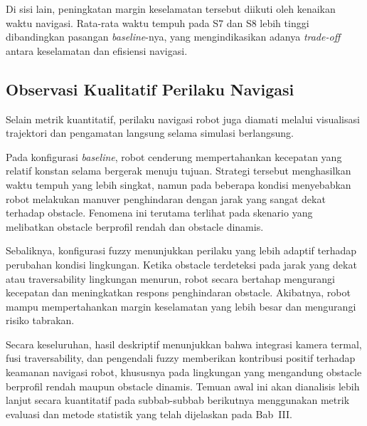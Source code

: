 Di sisi lain, peningkatan margin keselamatan tersebut diikuti oleh kenaikan waktu navigasi. Rata-rata waktu tempuh pada S7 dan S8 lebih tinggi dibandingkan pasangan \textit{baseline}-nya, yang mengindikasikan adanya \textit{trade-off} antara keselamatan dan efisiensi navigasi.

\subsection{Observasi Kualitatif Perilaku Navigasi}

Selain metrik kuantitatif, perilaku navigasi robot juga diamati melalui visualisasi trajektori dan pengamatan langsung selama simulasi berlangsung.

Pada konfigurasi \textit{baseline}, robot cenderung mempertahankan kecepatan yang relatif konstan selama bergerak menuju tujuan. Strategi tersebut menghasilkan waktu tempuh yang lebih singkat, namun pada beberapa kondisi menyebabkan robot melakukan manuver penghindaran dengan jarak yang sangat dekat terhadap obstacle. Fenomena ini terutama terlihat pada skenario yang melibatkan obstacle berprofil rendah dan obstacle dinamis.

Sebaliknya, konfigurasi fuzzy menunjukkan perilaku yang lebih adaptif terhadap perubahan kondisi lingkungan. Ketika obstacle terdeteksi pada jarak yang dekat atau traversability lingkungan menurun, robot secara bertahap mengurangi kecepatan dan meningkatkan respons penghindaran obstacle. Akibatnya, robot mampu mempertahankan margin keselamatan yang lebih besar dan mengurangi risiko tabrakan.

Secara keseluruhan, hasil deskriptif menunjukkan bahwa integrasi kamera termal, fusi traversability, dan pengendali fuzzy memberikan kontribusi positif terhadap keamanan navigasi robot, khususnya pada lingkungan yang mengandung obstacle berprofil rendah maupun obstacle dinamis. Temuan awal ini akan dianalisis lebih lanjut secara kuantitatif pada subbab-subbab berikutnya menggunakan metrik evaluasi dan metode statistik yang telah dijelaskan pada Bab~III.
